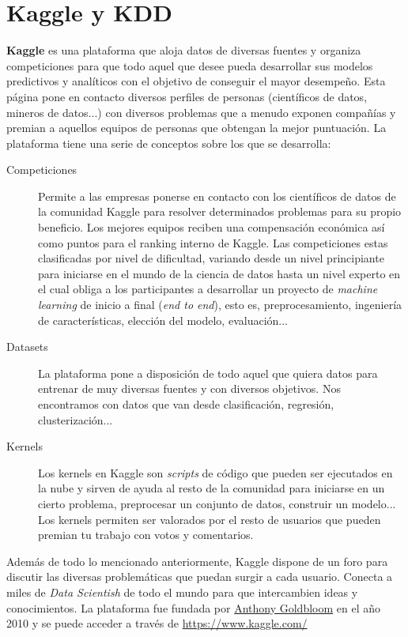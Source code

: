 \chapter{Kaggle y KDD}
\textbf{Kaggle} es una plataforma que aloja datos de diversas fuentes y organiza 
competiciones para que todo aquel que desee pueda desarrollar sus modelos predictivos y analíticos 
con el objetivo de conseguir el mayor desempeño.
Esta página pone en contacto diversos perfiles de personas (científicos de datos, mineros de datos...) 
con diversos problemas que a menudo exponen compañías y premian a aquellos equipos de personas que 
obtengan la mejor puntuación.
La plataforma tiene una serie de conceptos sobre los que se desarrolla:
\begin{description}
  \item[Competiciones] Permite a las empresas ponerse en contacto con los científicos de datos de la 
  comunidad Kaggle para resolver determinados problemas para su propio beneficio. Los mejores equipos 
  reciben una compensación económica así como puntos para el ranking interno de Kaggle.
  Las competiciones estas clasificadas por nivel de dificultad, variando desde un nivel principiante 
  para iniciarse en el mundo de la ciencia de datos hasta un nivel experto en el cual obliga a los 
  participantes a desarrollar un proyecto de \textit{machine learning} de inicio a final (\textit{end to end}), esto es, 
  preprocesamiento, ingeniería de características, elección del modelo, evaluación...
  \item[Datasets] La plataforma pone a disposición de todo aquel que quiera datos para entrenar de muy 
  diversas fuentes y con diversos objetivos. Nos encontramos con datos que van desde clasificación, 
  regresión, clusterización...
  \item[Kernels] Los kernels en Kaggle son \textit{scripts} de código que pueden ser ejecutados 
  en la nube y sirven de ayuda al resto de la comunidad para iniciarse en un cierto problema, preprocesar un 
  conjunto de datos, construir un modelo...
  Los kernels permiten ser valorados por el resto de usuarios que pueden premian tu trabajo con votos y comentarios.
\end{description}
Además de todo lo mencionado anteriormente, Kaggle dispone de un foro para discutir las diversas 
problemáticas que puedan surgir a cada usuario. Conecta a miles de \textit{Data Scientish} de todo el mundo 
para que intercambien ideas y conocimientos.
La plataforma fue fundada por \href{https://en.wikipedia.org/wiki/Anthony_Goldbloom}{Anthony Goldbloom} 
en el año 2010 y se puede acceder a través de \url{https://www.kaggle.com/}
\newline

